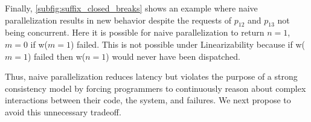 Finally, \cref{subfig:suffix_closed_breaks} shows an example where naive parallelization results in new behavior despite the requests of $p_{12}$ and $p_{13}$ not being concurrent. Here it is possible for naive parallelization to return $n=1$, $m=0$ if w($m=1$) failed. This is not possible under Linearizability because if w($m=1$) failed then w($n=1$) would never have been dispatched.

Thus, naive parallelization reduces latency but violates the purpose of a strong consistency model by forcing programmers to continuously reason about complex interactions between their code, the system, and failures. We next propose \mdl{} to avoid this unnecessary tradeoff.


